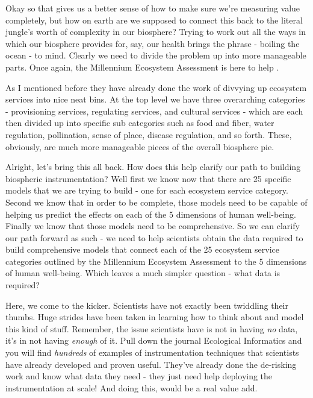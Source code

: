 \documentclass[11pt]{book}
\begin{document}
Okay so that gives us a better sense of how to make sure we're measuring value completely, but how on earth are we supposed to connect this back to the literal jungle's worth of complexity in our biosphere? Trying to work out all the ways in which our biosphere provides for, say, our health brings the phrase - boiling the ocean - to mind. Clearly we need to divide the problem up into more manageable parts. Once again, the Millennium Ecosystem Assessment is here to help \cite{mas}. 

As I mentioned before they have already done the work of divvying up ecosystem services into nice neat bins. At the top level we have three overarching categories - provisioning services, regulating services, and cultural services - which are each then divided up into specific sub categories such as food and fiber, water regulation, pollination, sense of place, disease regulation, and so forth. These, obviously, are much more manageable pieces of the overall biosphere pie.
\newline

Alright, let's bring this all back. How does this help clarify our path to building biospheric instrumentation? Well first we know now that there are 25 specific models that we are trying to build - one for each ecosystem service category. Second we know that in order to be complete, those models need to be capable of helping us predict the effects on each of the 5 dimensions of human well-being. Finally we know that those models need to be comprehensive. So we can clarify our path forward as such - we need to help scientists obtain the data required to build comprehensive models that connect each of the 25 ecosystem service categories outlined by the Millennium Ecosystem Assessment to the 5 dimensions of human well-being. Which leaves a much simpler question - what data is required?
\newline

Here, we come to the kicker. Scientists have not exactly been twiddling their thumbs. Huge strides have been taken in learning how to think about and model this kind of stuff. Remember, the issue scientists have is not in having \textit{no} data, it's in not having \textit{enough} of it. Pull down the journal Ecological Informatics and you will find \textit{hundreds} of examples of instrumentation techniques that scientists have already developed and proven useful. They've already done the de-risking work and know what data they need - they just need help deploying the instrumentation at scale! And doing this, would be a real value add. 
\end{document}
